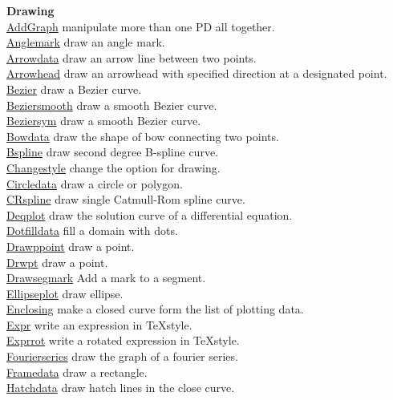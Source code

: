 \documentclass[papersize,a4paper,12pt]{article}
\begin{document}
\begin{tabbing}
{\bf Drawing} \> \\
\hyperlink{addgraph}{AddGraph} \> manipulate more than one PD all together.\\
\hyperlink{anglemark}{Anglemark} \> draw an angle mark.\\
\hyperlink{arrowdata}{Arrowdata}  \> draw an arrow line between two points.\\
\hyperlink{arrowhead}{Arrowhead}  \>draw an arrowhead with specified direction at a designated point.\\
\hyperlink{bezier}{Bezier} \> draw a  Bezier curve.\\
\hyperlink{beziersmooth}{Beziersmooth} \> draw a smooth Bezier curve.\\\hyperlink{beziersym}{Beziersym}  \> draw a smooth Bezier curve.\\
\hyperlink{bowdata}{Bowdata} \> draw the shape of bow connecting two points.\\
\hyperlink{bspline}{Bspline} \> draw second degree B-spline curve. \\
\hyperlink{changestyle}{Changestyle} \> change the option for drawing. \\
\hyperlink{circledata}{Circledata} \> draw a circle or polygon. \\
\hyperlink{crspline}{CRspline} \> draw single Catmull-Rom spline curve. \\
\hyperlink{deqplot}{Deqplot} \> draw the solution curve of a differential equation.\\
\hyperlink{dotfilldata}{Dotfilldata} \> fill a domain with dots.\\
\hyperlink{drwpt}{Drawppoint} \> draw a point. \\
\hyperlink{drwpt}{Drwpt} \> draw a point. \\
\hyperlink{drawsegmark}{Drawsegmark} \> Add a mark to a segment. \\
\hyperlink{ellipseplot}{Ellipseplot} \> draw ellipse.\\
\hyperlink{enclosing}{Enclosing} \> make a closed curve form the list of plotting data.\\
\hyperlink{expr}{Expr} \> write an expression in \TeX style.\\
\hyperlink{exprrot}{Exprrot} \> write a rotated expression in \TeX style.\\
\hyperlink{fourierseries}{Fourierseries} \> draw the graph of a fourier series.\\
\hyperlink{framedata}{Framedata} \> draw a rectangle.\\
\hyperlink{hatchdata}{Hatchdata} \> draw hatch lines in the close curve.\\

\end{tabbing}
\end{document}
